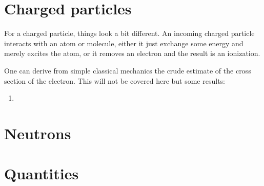 \documentclass{article}
\begin{document}
\section{Charged particles}

For a charged particle, things look a bit different.
An incoming charged particle interacts with an atom or molecule, either it just exchange some energy and merely excites the atom, or it removes an electron and the result is an ionization.

One can derive from simple classical mechanics the crude estimate of the cross section of the electron.
This will not be covered here but some results:

\begin{enumerate}

	\item


		
\end{enumerate}







\section{Neutrons}

\section{Quantities}
\end{document}
